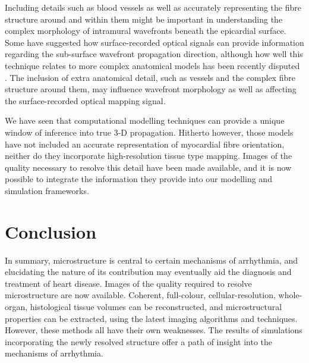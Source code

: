   Including details such as blood vessels as well as accurately representing the fibre structure around and within them might be important in understanding the complex morphology of intramural wavefronts beneath the epicardial surface. Some \cite{Ding2001, Hyatt2003} have suggested how surface-recorded optical signals can provide information regarding the sub-surface wavefront propagation direction, although how well this technique relates to more complex anatomical models has been recently disputed  \cite{Bishop2006}. The inclusion of extra anatomical detail, such as vessels and the complex fibre structure around them, may influence wavefront morphology as well as affecting the surface-recorded optical mapping signal.
  
  We have seen that computational modelling techniques can provide a unique window of inference into true 3-D propagation. Hitherto however, those models have not included an accurate representation of myocardial fibre orientation, neither do they incorporate high-resolution tissue type mapping. Images of the quality necessary to resolve this detail have been made available, and it is now possible to integrate the information they provide into our modelling and simulation frameworks.

\section{Conclusion} %
\label{sec:conclusion}
  In summary, microstructure is central to certain mechanisms of arrhythmia, and elucidating the nature of its contribution may eventually aid the diagnosis and treatment of heart disease. Images of the quality required to resolve microstructure are now available. Coherent, full-colour, cellular-resolution, whole-organ, histological tissue volumes can be reconstructed, and microstructural properties can be extracted, using the latest imaging algorithms and techniques. However, these methods all have their own weaknesses. The results of simulations incorporating the newly resolved structure offer a path of insight into the mechanisms of arrhythmia.


